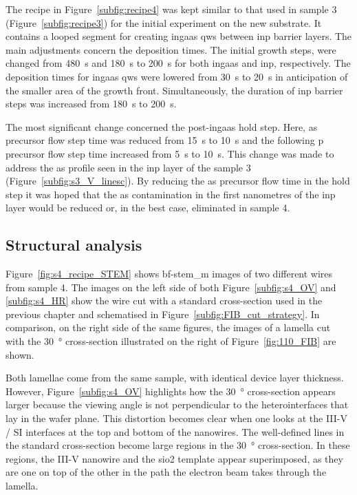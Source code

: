 The recipe in Figure~\ref{subfig:recipe4} was kept similar to that used in sample 3 (Figure~\ref{subfig:recipe3}) for the initial experiment on the new  substrate. It contains a looped segment for creating \acs{ingaas} \acl{qw}s between \acs{inp} barrier layers. The main adjustments concern the deposition times. The initial growth steps, were changed from \qty{480}{\second} and \qty{180}{\second} to \qty{200}{\second} for both \acs{ingaas} and \acs{inp}, respectively. The deposition times for \acs{ingaas} \acl{qw}s were lowered from \qty{30}{\second} to \qty{20}{\second} in anticipation of the smaller area of the growth front. Simultaneously, the duration of \acs{inp} barrier steps was increased from \qty{180}{\second} to \qty{200}{\second}.

The most significant change concerned the post-\acs{ingaas} hold step. Here, \acs{as} precursor flow step time was reduced from \qty{15}{s} to \qty{10}{s} and the following \acs{p} precursor flow step time increased from \qty{5}{s} to \qty{10}{s}. This change was made to address the \acs{as} profile seen in the \acs{inp} layer of the sample 3 (Figure~\ref{subfig:s3_V_linesc}). By reducing the \acs{as} precursor flow time in the hold step it was hoped that the \acs{as} contamination in the first nanometres of the \acs{inp} layer would be reduced or, in the best case, eliminated in sample 4.

\subsection{Structural analysis}

Figure~\ref{fig:s4_recipe_STEM} shows \acs{bf}-\acs{stem_m} images of two different wires from sample 4. The images on the left side of both Figure~\ref{subfig:s4_OV} and \ref{subfig:s4_HR} show the wire cut with a standard cross-section used in the previous chapter and schematised in Figure~\ref{subfig:FIB_cut_strategy}. In comparison, on the right side of the same figures, the images of a lamella cut with the \qty{30}{\degree} cross-section illustrated on the right of Figure~\ref{fig:110_FIB} are shown. 

Both lamellae come from the same sample, with identical device layer thickness. 
However, Figure~\ref{subfig:s4_OV} highlights how the \qty{30}{\degree} cross-section appears larger because the viewing angle is not perpendicular to the heterointerfaces that lay in the wafer plane. This distortion becomes clear when one looks at the III-V / \acs{SI} interfaces at the top and bottom of the nanowires. The well-defined lines in the standard cross-section become large regions in the \qty{30}{\degree} cross-section. In these regions, the III-V nanowire and the \acs{sio2} template appear superimposed, as they are one on top of the other in the path the electron beam takes through the lamella.

